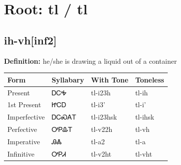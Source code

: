 \documentclass{article}%
\begin{document}
%
\normalsize%
\section*{Root: tl / tl}%
\subsection*{ih-vh[inf2]}%
\textbf{Definition: }%
he/she is drawing a liquid out of a container%
\\[0.5em]%
\begin{tabular}{|l|l|l|l|}%
\hline%
\textbf{Form}&\textbf{Syllabary}&\textbf{With Tone}&\textbf{Toneless}\\%
\hline%
Present&ᎠᏟᎭ&tl{-}i23h&tl{-}ih\\%
1st Present&ᏥᏟᎠ&tl{-}i3'&tl{-}i'\\%
Imperfective&ᎠᏟᏍᎪᎢ&tl{-}i23hsk&tl{-}ihsk\\%
Perfective&ᎤᏢᎲᎢ&tl{-}v22h&tl{-}vh\\%
Imperative&ᎯᏜ&tl{-}a2&tl{-}a\\%
Infinitive&ᎤᏢᏗ&tl{-}v2ht&tl{-}vht\\%
\hline%
\end{tabular}%
\\[1em]%
\end{document}

